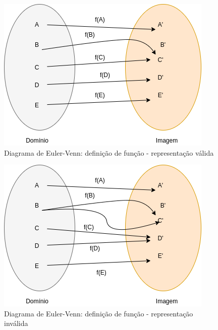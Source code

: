 \begin{multicols*}{2}
    \begin{figure}[H]
        \centering
        \caption{Diagrama de Euler-Venn: definição de função - representação válida}
        \includegraphics[scale=0.4]{assets/rafael/img1.png}
    \end{figure}


    \begin{figure}[H]
        \centering
        \caption{Diagrama de Euler-Venn: definição de função - representação inválida}
        \includegraphics[scale=0.4]{assets/rafael/img2.png}
    \end{figure}

\end{multicols*}
